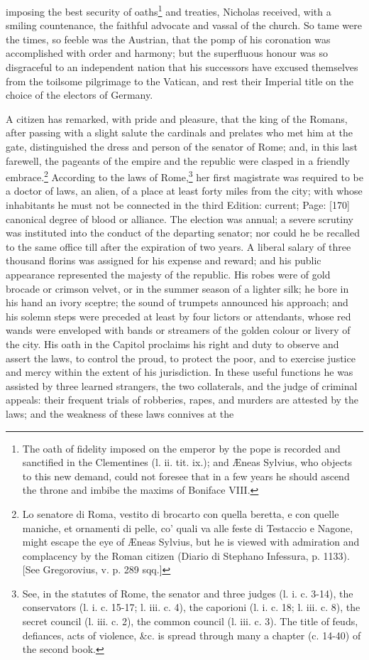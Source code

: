 imposing the best security of oaths\footnote{The oath of fidelity imposed on the emperor by the pope is recorded and sanctified in the Clementines (l. ii. tit. ix.); and Æneas Sylvius, who objects to this new demand, could not foresee that in a few years he should ascend the throne and imbibe the maxims of Boniface VIII.} and treaties, Nicholas received, with a smiling countenance, the faithful advocate and vassal of the church. So tame were the times, so feeble was the Austrian, that the pomp of his coronation was accomplished with order and harmony; but the superfluous honour was so disgraceful to an independent nation that his successors have excused themselves from the toilsome pilgrimage to the Vatican, and rest their Imperial title on the choice of the electors of Germany.

A citizen has remarked, with pride and pleasure, that the king of the Romans, after passing with a slight salute the cardinals and prelates who met him at the gate, distinguished the dress and person of the senator of Rome; and, in this last farewell, the pageants of the empire and the republic were clasped in a friendly embrace.\footnote{Lo senatore di Roma, vestito di brocarto con quella beretta, e con quelle maniche, et ornamenti di pelle, co\texthebrew{}’ quali va alle feste di Testaccio e Nagone, might escape the eye of Æneas Sylvius, but he is viewed with admiration and complacency by the Roman citizen (Diario di Stephano Infessura, p. 1133). [See Gregorovius, v. p. 289 sqq.]} According to the laws of Rome,\footnote{See, in the statutes of Rome, the senator and three judges (l. i. c. 3-14), the conservators (l. i. c. 15-17; l. iii. c. 4), the caporioni (l. i. c. 18; l. iii. c. 8), the secret council (l. iii. c. 2), the common council (l. iii. c. 3). The title of feuds, defiances, acts of violence, \&c. is spread through many a chapter (c. 14-40) of the second book.} her first magistrate was required to be a doctor of laws, an alien, of a place at least forty miles from the city; with whose inhabitants he must not be connected in the third Edition: current; Page: [170] canonical degree of blood or alliance. The election was annual; a severe scrutiny was instituted into the conduct of the departing senator; nor could he be recalled to the same office till after the expiration of two years. A liberal salary of three thousand florins was assigned for his expense and reward; and his public appearance represented the majesty of the republic. His robes were of gold brocade or crimson velvet, or in the summer season of a lighter silk; he bore in his hand an ivory sceptre; the sound of trumpets announced his approach; and his solemn steps were preceded at least by four lictors or attendants, whose red wands were enveloped with bands or streamers of the golden colour or livery of the city. His oath in the Capitol proclaims his right and duty to observe and assert the laws, to control the proud, to protect the poor, and to exercise justice and mercy within the extent of his jurisdiction. In these useful functions he was assisted by three learned strangers, the two collaterals, and the judge of criminal appeals: their frequent trials of robberies, rapes, and murders are attested by the laws; and the weakness of these laws connives at the 